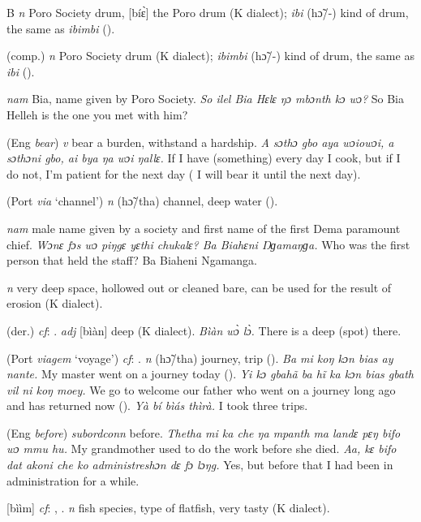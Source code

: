 \begin{letter}{B}
 \textit{n} Poro Society drum, [bíɛ̀] the Poro drum (K dialect); \textit{ibi} (hɔ̃/-) kind of drum, the same as \textit{ibimbi} (\citealt{Pichl1967}). 

 (comp.) \textit{n} Poro Society drum (K dialect); \textit{ibimbi} (hɔ̃/-) kind of drum, the same as \textit{ibi} (\citealt{Pichl1967}). 

 \textit{nam} Bia, name given by Poro Society. \textit{So ilel Bia Hɛlɛ ŋɔ mbɔnth kɔ wɔ?} So Bia Helleh is the one you met with him? 

 (Eng \textit{bear}) \textit{v} bear a burden, withstand a hardship. \textit{A sɔthɔ gbo aya wɔiowɔi, a sɔthɔni gbo, ai bya ŋa wɔi ŋallɛ.} If I have (something) every day I cook, but if I do not, I'm patient for the next day ( I will bear it until the next day). 

 (Port \textit{via} ‘channel') \textit{n} (hɔ̃/tha) channel, deep water (\citealt{Pichl1967}). 

 \textit{nam} male name given by a society and first name of the first Dema paramount chief. \textit{Wɔnɛ fɔs wɔ piŋgɛ yɛthi chukalɛ? Ba Biahɛni Ŋɡamaŋɡa.} Who was the first person that held the staff? Ba Biaheni Ngamanga.

 \textit{n} very deep space, hollowed out or cleaned bare, can be used for the result of erosion (K dialect). 

 (der.) \textit{cf}: . \textit{adj} [bìàn] deep (K dialect). \textit{Bìàn wɔ̀ lɔ̀.} There is a deep (spot) there.

 (Port \textit{viagem} ‘voyage') \textit{cf}: . \textit{n} (hɔ̃/tha) journey, trip (\citealt{Pichl1967}). \textit{Ba mi koŋ kɔn bias ay nante.} My master went on a journey today (\citealt{Pichl1967}). \textit{Yi kɔ gbahã ba hĩ ka kɔn bias gbath vil ni koŋ moey.} We go to welcome our father who went on a journey long ago and has returned now (\citealt{Pichl1967}). \textit{Yà bí bìás thìrà.} I took three trips.

 (Eng \textit{before}) \textit{subordconn} before. \textit{Thetha mi ka che ŋa mpanth ma landɛ pɛŋ bifo wɔ mmu hu.} My grandmother used to do the work before she died. \textit{Aa, kɛ bifo dat akoni che ko administreshɔn dɛ fɔ lɔŋg.} Yes, but before that I had been in administration for a while.

 [bììm] \textit{cf}: , . \textit{n} fish species, type of flatfish, very tasty (K dialect).


\end{letter}

